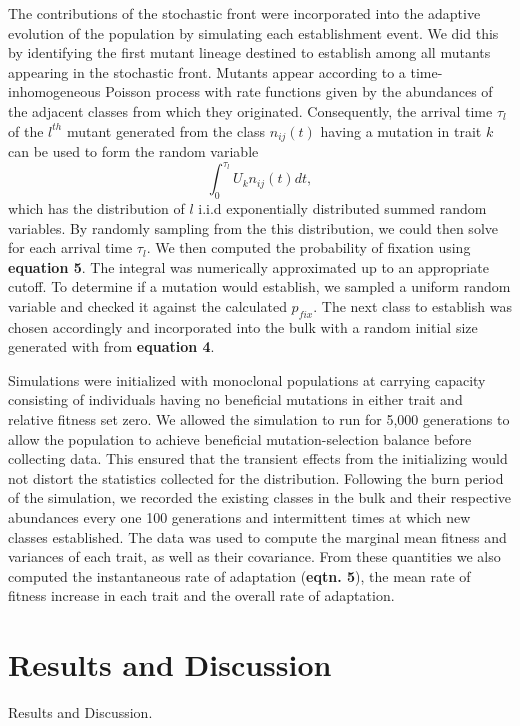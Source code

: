 \documentclass[9pt,twocolumn,twoside]{gsajnl}
\begin{document}
The contributions of the stochastic front were incorporated into the adaptive evolution of the population by simulating each establishment event.  We did this by identifying the first mutant lineage destined to establish among all mutants appearing in the stochastic front.  Mutants appear according to a time-inhomogeneous Poisson process with rate functions given by the abundances of the adjacent classes from which they originated. Consequently, the arrival time $\tau_l$ of the $l^{th}$ mutant generated from the class $n_{ij}(t)$ having a mutation in trait $k$ can be used to form the random variable
\[ 
\int_0^{\tau_l} U_k n_{ij}(t) dt ,
\] 
which has the distribution of $l$ i.i.d exponentially distributed summed random variables. By randomly sampling from the this distribution, we could then solve for each arrival time $\tau_l$.   We then computed the probability of fixation using \textbf{equation 5}.  The integral was numerically approximated up to an appropriate cutoff.  To determine if a mutation would establish, we sampled a uniform random variable and checked it against the calculated $p_{fix}$. The next class to establish was chosen accordingly and incorporated into the bulk with a random initial size generated with from \textbf{equation 4}.\par

Simulations were initialized with monoclonal populations at carrying capacity consisting of individuals having no beneficial mutations in either trait and relative fitness set zero. We allowed the simulation to run for 5,000 generations to allow the population to achieve beneficial mutation-selection balance before collecting data. This ensured that the transient effects from the initializing would not distort the statistics collected for the distribution. Following the burn period of the simulation, we recorded the existing classes in the bulk and their respective abundances every one 100 generations and intermittent times at which new classes established. The data was used to compute the marginal mean fitness and variances of each trait, as well as their covariance. From these quantities we also computed the instantaneous rate of adaptation (\textbf{eqtn. 5}), the mean rate of fitness increase in each trait and the overall rate of adaptation.

\section{Results and Discussion}

Results and Discussion.
\end{document}
